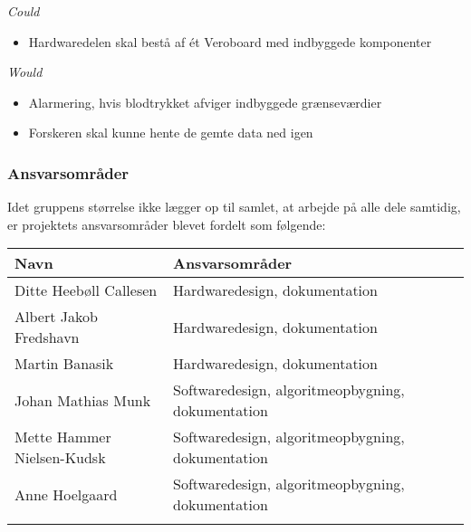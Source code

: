 \textit{Could}
\begin{itemize}
\item Hardwaredelen skal bestå af ét Veroboard med indbyggede komponenter

\end{itemize} 
\textit{Would} \\[-1ex]
\begin{itemize}
\item Alarmering, hvis blodtrykket afviger indbyggede grænseværdier
\item Forskeren skal kunne hente de gemte data ned igen
\end{itemize}

\subsubsection{Ansvarsområder}

Idet gruppens størrelse ikke lægger op til samlet, at arbejde på alle dele samtidig, er projektets ansvarsområder blevet fordelt som følgende:

\begin{longtabu} to 
    Navn &    Ansvarsområder &    \\[-1ex]
    \midrule
    Ditte Heebøll Callesen &   Hardwaredesign, dokumentation	&    \\
    Albert Jakob Fredshavn &   Hardwaredesign, dokumentation	&    \\
    Martin Banasik         &   Hardwaredesign, dokumentation	&    \\
    Johan Mathias Munk     &   Softwaredesign, algoritmeopbygning, dokumentation &    \\
    Mette Hammer Nielsen-Kudsk &   Softwaredesign, algoritmeopbygning, dokumentation &    \\
   	Anne Hoelgaard    &   Softwaredesign, algoritmeopbygning, dokumentation	&    \\
\label{version_Systemark}
\end{longtabu}

